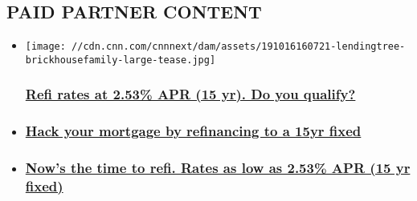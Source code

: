 \hypertarget{paid-partner-content-}{%
\subsection{PAID PARTNER CONTENT~}\label{paid-partner-content-}}

\begin{itemize}
\item
  \href{https://ck.lendingtree.com/?a=343\&c=2546\&p=r\&s1=sections\&mtaid=A944E\&ctype=sectionfronts\&cmethod=refiform\&rcode=1000\&ccreative=refiratesat25315yrdoyouqualify_brickhousefamily\&placement_name=sectionfronts\&ad_headline=refiratesat25315yrdoyouqualify\&ad_image_name=brickhousefamily}{}

  \texttt{[image: //cdn.cnn.com/cnnnext/dam/assets/191016160721-lendingtree-brickhousefamily-large-tease.jpg]}

  \hypertarget{refi-rates-at-253-apr-15-yr-do-you-qualify}{%
  \subsubsection{\texorpdfstring{\href{https://ck.lendingtree.com/?a=343\&c=2546\&p=r\&s1=sections\&mtaid=A944E\&ctype=sectionfronts\&cmethod=refiform\&rcode=1000\&ccreative=refiratesat25315yrdoyouqualify_brickhousefamily\&placement_name=sectionfronts\&ad_headline=refiratesat25315yrdoyouqualify\&ad_image_name=brickhousefamily}{Refi
  rates at 2.53\% APR (15 yr). Do you
  qualify?}}{Refi rates at 2.53\% APR (15 yr). Do you qualify?}}\label{refi-rates-at-253-apr-15-yr-do-you-qualify}}
\item
  \hypertarget{hack-your-mortgage-by-refinancing-to-a-15yr-fixed}{%
  \subsubsection{\texorpdfstring{\href{https://ck.lendingtree.com/?a=343\&c=2546\&p=r\&s1=sections\&mtaid=A944E\&ctype=sectionfronts\&cmethod=refiform\&rcode=1000\&ccreative=hackmortrefi_brickhousefamily\&placement_name=sectionfronts\&ad_headline=hackmortrefi\&ad_image_name=brickhousefamily}{Hack
  your mortgage by refinancing to a 15yr
  fixed}}{Hack your mortgage by refinancing to a 15yr fixed}}\label{hack-your-mortgage-by-refinancing-to-a-15yr-fixed}}
\item
  \hypertarget{nows-the-time-to-refi-rates-as-low-as-253-apr-15-yr-fixed}{%
  \subsubsection{\texorpdfstring{\href{https://ck.lendingtree.com/?a=343\&c=2546\&p=r\&s1=sections\&mtaid=A944E\&ctype=sectionfronts\&cmethod=refiform\&rcode=1000\&ccreative=nowsthetimerefi253apr15yr_brickhousefamily\&placement_name=sectionfronts\&ad_headline=nowsthetimerefi253apr15yr\&ad_image_name=brickhousefamily}{Now's
  the time to refi. Rates as low as 2.53\% APR (15 yr
  fixed)}}{Now's the time to refi. Rates as low as 2.53\% APR (15 yr fixed)}}\label{nows-the-time-to-refi-rates-as-low-as-253-apr-15-yr-fixed}}
\end{itemize}

